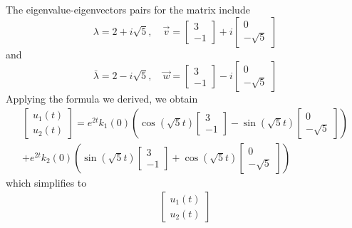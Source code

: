 \documentclass[../book.tex]{subfiles}
\begin{document}
\begin{solution}
The eigenvalue-eigenvectors pairs for the matrix include
\begin{equation}\label{eq:sys-25}
\lambda = 2 + i \sqrt{5}, \quad
\vec{v} 
=
\begin{bmatrix}
  3 \\ -1
\end{bmatrix}
+
i 
\begin{bmatrix}
  0\\
  -\sqrt{5}
\end{bmatrix}
\end{equation}
and
\begin{equation}\label{eq:sys-26}
\bar
\lambda = 2 - i \sqrt{5}, \quad
\vec{w}
=
\begin{bmatrix}
  3 \\ -1
\end{bmatrix}
- i
\begin{bmatrix}
  0 \\ -\sqrt{5}
\end{bmatrix}
\end{equation}
Applying the formula we derived, we obtain
\begin{multline}\label{eq:sys-27}
  \begin{bmatrix}
    u_1(t) 
    \\
    u_2(t)
  \end{bmatrix}		=
  e^{2 t} 
  k_1(0)
  \left( 
    \cos (\sqrt{5} t) 
    \begin{bmatrix}
      3 \\ -1
    \end{bmatrix}
    -
    \sin (\sqrt{5} t) 
    \begin{bmatrix}
      0 \\ -\sqrt{5}
    \end{bmatrix}
  \right)
  \\[1ex]
  +
  e^{2 t} 
  k_2(0)
  \left( 
    \sin (\sqrt{5} t) 
    \begin{bmatrix}
      3 \\ -1
    \end{bmatrix}
    +
    \cos (\sqrt{5} t) 
    \begin{bmatrix}
      0 \\ -\sqrt{5}
    \end{bmatrix}
  \right)
\end{multline}
which simplifies to
\begin{multline}\label{eq:sys-28}
  \begin{bmatrix}
    u_1(t) \\ u_2(t)

\end{bmatrix}
\end{multline}
\end{solution}
\end{document}
